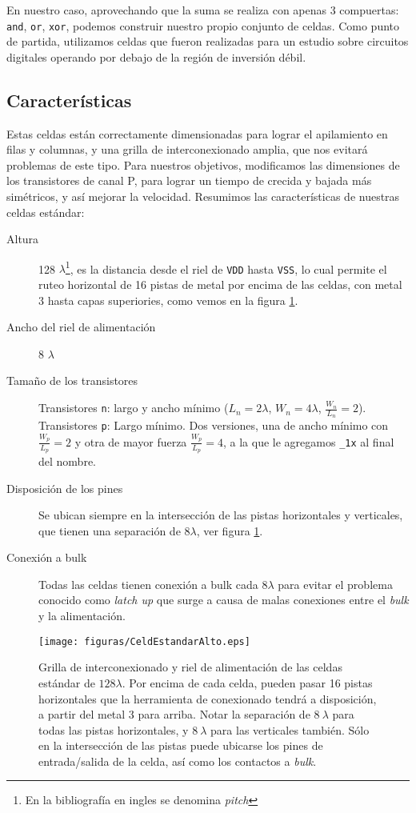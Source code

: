 En nuestro caso, aprovechando que la suma se realiza con apenas 3 compuertas: \verb.and., \verb.or., \verb.xor., podemos construir nuestro propio conjunto de celdas. Como punto de partida, utilizamos celdas que fueron realizadas para un estudio sobre circuitos digitales operando por debajo de la región de inversión débil\cite{subthresholdArith}.
\subsection{Características}
Estas celdas están correctamente dimensionadas para lograr el apilamiento en filas y columnas, y una grilla de interconexionado amplia, que nos evitará problemas de este tipo. Para nuestros objetivos, modificamos las dimensiones de los transistores de canal P, para lograr un tiempo de crecida y bajada más simétricos, y así mejorar la velocidad. Resumimos las características de nuestras celdas estándar:


\begin{description}
\item[Altura] 128 $\lambda$\footnote{En la bibliografía en ingles se denomina \emph{pitch}}, es la distancia desde el riel de \verb.VDD. hasta \verb.VSS., lo cual permite el ruteo horizontal de 16 pistas de metal por encima de las celdas, con metal 3 hasta capas superiories, como vemos en la figura \ref{fig:pitchCeldaEstandar}.  
\item[Ancho del riel de alimentación] 8 $\lambda$
\item[Tamaño de los transistores] Transistores \verb.n.: largo y ancho mínimo ($L_n = 2 \lambda$, $W_n =4 \lambda$, $\frac{W_n}{L_n}=2$). Transistores \verb.p.: Largo mínimo. Dos versiones, una de ancho mínimo con $\frac{W_p}{L_p}=2$ y otra de mayor fuerza $\frac{W_p}{L_p}=4$, a la que le agregamos \verb._1x. al final del nombre. 
\item[Disposición de los pines] Se ubican siempre en la intersección de las pistas horizontales y verticales, que tienen una separación de $8 \lambda$, ver figura \ref{fig:pitchCeldaEstandar}.
\item[Conexión a bulk] Todas las celdas tienen conexión a bulk cada $8\lambda$ para evitar el problema conocido como \emph{latch up} que surge a causa de malas conexiones entre el \emph{bulk} y la alimentación.
\end{description}  

 \begin{figure}[h]
\centering
\texttt{[image: figuras/CeldEstandarAlto.eps]}
  \caption{Grilla de interconexionado y riel de alimentación de las celdas estándar de $128 \lambda$. Por encima de cada celda, pueden pasar 16 pistas horizontales que la herramienta de conexionado tendrá a disposición, a partir del metal 3 para arriba. Notar la separación de $8~ \lambda$ para todas las pistas horizontales, y $8~\lambda$ para las verticales también. Sólo en la intersección de las pistas puede ubicarse los pines de entrada/salida de la celda, así como los contactos a \emph{bulk}.}
  \label{fig:pitchCeldaEstandar}
\end{figure}

